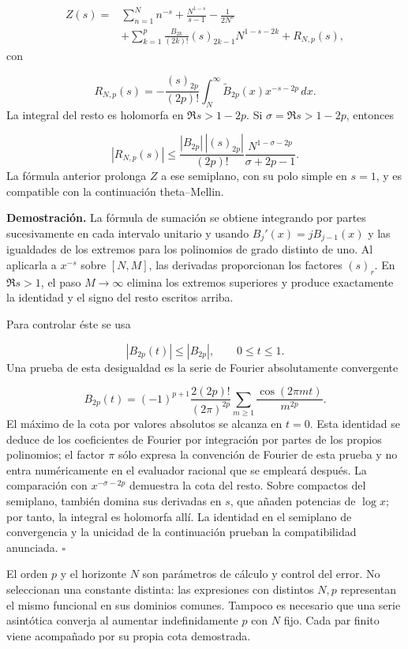\[
\begin{aligned}
Z(s)={}&\sum_{n=1}^N n^{-s}+\frac{N^{1-s}}{s-1}-\frac1{2N^s}\\
&+\sum_{k=1}^p\frac{B_{2k}}{(2k)!}(s)_{2k-1}N^{1-s-2k}
+R_{N,p}(s),
\end{aligned}
\]
con

\[
R_{N,p}(s)=-\frac{(s)_{2p}}{(2p)!}
\int_N^\infty\widetilde B_{2p}(x)x^{-s-2p}\,dx.
\]
La integral del resto es holomorfa en \(\Re s>1-2p\). Si \(\sigma=\Re s>1-2p\), entonces

\[
|R_{N,p}(s)|\leq
\frac{|B_{2p}|\,|(s)_{2p}|}{(2p)!}
\frac{N^{1-\sigma-2p}}{\sigma+2p-1}.
\]
La fórmula anterior prolonga \(Z\) a ese semiplano, con su polo simple en \(s=1\), y es compatible con la continuación theta–Mellin.

\textbf{Demostración.} La fórmula de sumación se obtiene integrando por partes sucesivamente en cada intervalo unitario y usando \(B_j'(x)=jB_{j-1}(x)\) y las igualdades de los extremos para los polinomios de grado distinto de uno. Al aplicarla a \(x^{-s}\) sobre \([N,M]\), las derivadas proporcionan los factores \((s)_r\). En \(\Re s>1\), el paso \(M\to\infty\) elimina los extremos superiores y produce exactamente la identidad y el signo del resto escritos arriba.

Para controlar éste se usa

\[
|B_{2p}(t)|\leq |B_{2p}|,\qquad 0\leq t\leq1.
\]
Una prueba de esta desigualdad es la serie de Fourier absolutamente convergente

\[
B_{2p}(t)=(-1)^{p+1}\frac{2(2p)!}{(2\pi)^{2p}}
\sum_{m\geq1}\frac{\cos(2\pi mt)}{m^{2p}}.
\]
El máximo de la cota por valores absolutos se alcanza en \(t=0\). Esta identidad se deduce de los coeficientes de Fourier por integración por partes de los propios polinomios; el factor \(\pi\) sólo expresa la convención de Fourier de esta prueba y no entra numéricamente en el evaluador racional que se empleará después. La comparación con \(x^{-\sigma-2p}\) demuestra la cota del resto. Sobre compactos del semiplano, también domina sus derivadas en \(s\), que añaden potencias de \(\log x\); por tanto, la integral es holomorfa allí. La identidad en el semiplano de convergencia y la unicidad de la continuación prueban la compatibilidad anunciada. \hfill\(\square\)

El orden \(p\) y el horizonte \(N\) son parámetros de cálculo y control del error. No seleccionan una constante distinta: las expresiones con distintos \(N,p\) representan el mismo funcional en sus dominios comunes. Tampoco es necesario que una serie asintótica converja al aumentar indefinidamente \(p\) con \(N\) fijo. Cada par finito viene acompañado por su propia cota demostrada.

